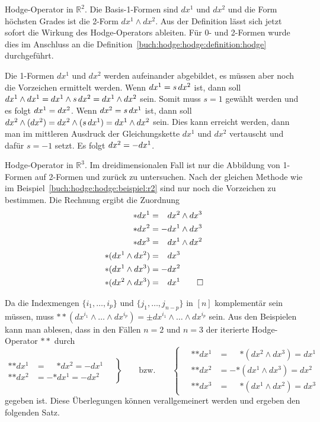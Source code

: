 \begin{beispiel}
\label{buch:hodge:hodge:beispiel:r2}
Hodge-Operator in $\mathbb{R}^2$.
Die Basis-1-Formen sind $dx^1$ und $dx^2$ und die Form höchsten Grades ist
die 2-Form $dx^1\wedge dx^2$.
Aus der Definition lässt sich jetzt sofort die Wirkung des Hodge-Operators
ableiten.
Für 0- und 2-Formen wurde dies im Anschluss an die
Definition~\ref{buch:hodge:hodge:definition:hodge} durchgeführt.

Die 1-Formen $dx^1$ und $dx^2$ werden aufeinander abgebildet, es müssen
aber noch die Vorzeichen ermittelt werden.
Wenn $\*dx^1=s\,dx^2$ ist, dann soll
$dx^1\wedge \*dx^1=dx^1\wedge s\,dx^2=dx^1\wedge dx^2$ sein.
Somit muss $s=1$ gewählt werden und es folgt $\*dx^1=dx^2$.
Wenn $\*dx^2=s\,dx^1$ ist, dann soll
$dx^2\wedge(\*dx^2)=dx^2\wedge(s\,dx^1)=dx^1\wedge dx^2$ sein.
Dies kann erreicht werden, dann man im mittleren Ausdruck der
Gleichungskette $dx^1$ und $dx^2$ vertauscht und dafür $s=-1$ setzt.
Es folgt $\*dx^2=-dx^1$.
\end{beispiel}

\begin{beispiel}
\label{buch:hodge:hodge:beispiel:r3}
Hodge-Operator in $\mathbb{R}^3$.
Im dreidimensionalen Fall ist nur die Abbildung von 1-Formen auf
2-Formen und zurück zu untersuchen.
Nach der gleichen Methode wie im
Beispiel~\ref{buch:hodge:hodge:beispiel:r2}
sind nur noch die Vorzeichen zu bestimmen.
Die Rechnung ergibt die Zuordnung
\begin{align*}
\ast dx^1 &= \phantom{-}dx^2\wedge dx^3 \\
\ast dx^2 &=          - dx^1\wedge dx^3 \\
\ast dx^3 &= \phantom{-}dx^1\wedge dx^2 \\
\ast(dx^1\wedge dx^2) &= \phantom{-}dx^3 \\
\ast(dx^1\wedge dx^3) &=          - dx^2 \\
\ast(dx^2\wedge dx^3) &= \phantom{-}dx^1
\qedhere
\end{align*}
\end{beispiel}

Da die Indexmengen $\{i_1,\dots,i_p\}$ und
$\{j_1,\dots,j_{n-p}\}$ in $[n]$ komplementär sein müssen,
muss
\(
\ast{\ast}(dx^{i_1}\wedge\dots\wedge dx^{i_p})
=
\pm dx^{i_1}\wedge\dots\wedge dx^{i_p}
\)
sein.
Aus den Beispielen kann man ablesen, dass in den Fällen $n=2$ und $n=3$
der iterierte Hodge-Operator  $\ast\ast$ durch
\[
\left.
\begin{aligned}
\ast{\ast dx^1} &= \phantom{-}{\ast dx^2} = -dx^1\\
\ast{\ast dx^2} &=          - {\ast dx^1} = -dx^2
\end{aligned}
\quad
\right\}
\qquad
\text{bzw.}
\qquad
\left\{
\quad
\begin{aligned}
\ast{\ast dx^1} &= \phantom{-}{\ast(dx^2\wedge dx^3)} = dx^1 \\
\ast{\ast dx^2} &=          - {\ast(dx^1\wedge dx^3)} = dx^2 \\
\ast{\ast dx^3} &= \phantom{-}{\ast(dx^1\wedge dx^2)} = dx^3 
\end{aligned}
\right.
\]
gegeben ist.
Diese Überlegungen können verallgemeinert werden und ergeben den
folgenden Satz.

